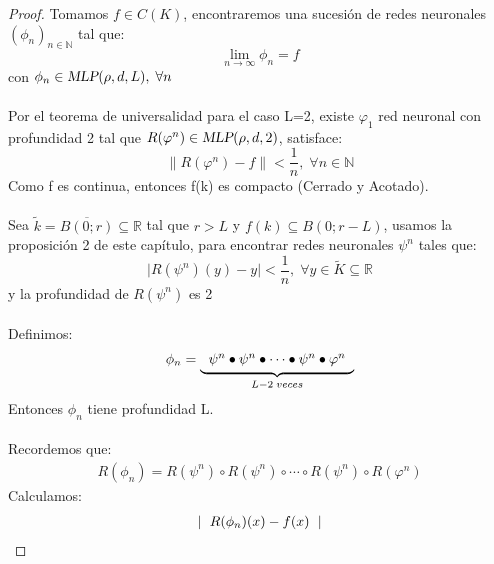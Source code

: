 \documentclass[12pt,a4paper]{book}
\providecommand{\abs}[1]{\lvert#1\rvert}
\providecommand{\norm}[1]{\lVert#1\rVert}
\providecommand{\mlp}[1]{\textsl{MLP}(\rho,d,#1)}
\begin{document}
\begin{proof}
Tomamos $f\in C(K)$, encontraremos una sucesión de redes neuronales $(\phi_{n})_{n\in\mathbb{N}}$ tal que:
\begin{equation*}
\lim_{n\rightarrow\infty}\phi_{n}=f
\end{equation*}
con $\phi_{n}\in\mlp{L},\;\forall n$\\
\\
Por el teorema de universalidad para el caso L=2, existe $\varphi_{1}$ red neuronal con profundidad 2 tal que $R(\varphi^{n})\in\mlp{2}$, satisface:
\begin{equation}
\label{U.L.1}
\norm{R(\varphi^{n})-f}<\frac{1}{n},\;\forall n\in\mathbb{N}
\end{equation}
Como f es continua, entonces f(k) es compacto (Cerrado y Acotado).\\
\\
Sea $\tilde{k}=\overline{B(0;r)}\subseteq\mathbb{R}$ tal que $r>L$ y $f(k)\subseteq B(0;r-L)$, usamos la proposición 2 de este capítulo, para encontrar redes neuronales $\psi^{n}$ tales que:
\begin{equation}
\label{(U.L.2)}
\abs{R(\psi^{n})(y)-y}<\frac{1}{n},\;\forall y\in \tilde{K}\subseteq \mathbb{R}
\end{equation}
y la profundidad de $R(\psi^{n})$ es 2\\
\\
Definimos:
\begin{equation*}
\begin{split}
\phi_{n}=
\underbrace{
\begin{tabular}{c}
$\psi^{n}\bullet\psi^{n}\bullet\cdots\bullet\psi^{n}\bullet\varphi^{n}$ \\ 
\end{tabular} 
}_{L-2\;veces}
\end{split}
\end{equation*}
Entonces $\phi_{n}$ tiene profundidad L.\\
\\
Recordemos que:
\begin{equation*}
\begin{split}
R(\phi_{n})=R(\psi^{n})\circ R(\psi^{n})\circ\cdots\circ R(\psi^{n})\circ R(\varphi^{n})
\end{split}
\end{equation*}
Calculamos:
\begin{equation*}
\begin{split}
\abs{
\begin{tabular}{c}
$R(\phi_{n})(x)-f(x)$

\end{tabular}}
\end{split}
\end{equation*}
\end{proof}
\end{document}
